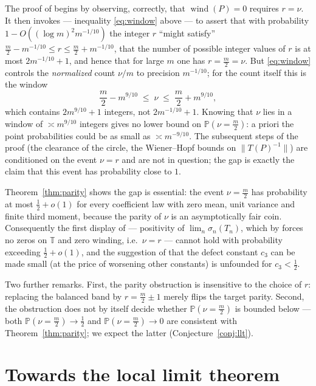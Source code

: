 \documentclass[11pt]{article}
\newcommand{\T}{\mathbb{T}}
\newcommand{\PP}{\mathbb{P}}
\newcommand{\wind}{\operatorname{wind}}
\begin{document}
The proof of \cite[Theorem~2.1]{Manrique} begins by observing, correctly, that
$\wind(P)=0$ requires $r=\nu$.  It then invokes
\cite[Theorem~3.1]{Manrique} --- inequality \eqref{eq:window} above --- to
assert that with probability $1-O((\log m)^2m^{-1/10})$ the integer $r$
``might satisfy''
$\frac m2-m^{-1/10}\le r\le\frac m2+m^{-1/10}$, that the number of possible
integer values of $r$ is at most $2m^{-1/10}+1$, and hence that for large $m$
one has $r=\frac m2=\nu$.  But \eqref{eq:window} controls the
\emph{normalized} count $\nu/m$ to precision $m^{-1/10}$; for the count itself
this is the window
\[
\frac m2-m^{9/10}\;\le\;\nu\;\le\;\frac m2+m^{9/10},
\]
which contains $2m^{9/10}+1$ integers, not $2m^{-1/10}+1$.  Knowing that $\nu$
lies in a window of $\asymp m^{9/10}$ integers gives no lower bound on
$\PP(\nu=\frac m2)$: a priori the point probabilities could be as small as
$\asymp m^{-9/10}$.  The subsequent steps of the proof (the clearance of the
circle, the Wiener--Hopf bounds on $\|T(P)^{-1}\|$) are conditioned on the event
$\nu=r$ and are not in question; the gap is exactly the claim that this event
has probability close to $1$.

Theorem~\ref{thm:parity} shows the gap is essential: the event $\nu=\frac m2$
has probability at most $\tfrac12+o(1)$ for every coefficient law with zero
mean, unit variance and finite third moment, because the parity of $\nu$ is an
asymptotically fair coin.  Consequently the first display of
\cite[Theorem~2.1]{Manrique} --- positivity of $\lim_n\sigma_n(T_n)$, which by
\cite[Corollary~6.5]{BG} forces no zeros on $\T$ and zero winding, i.e.\
$\nu=r$ --- cannot hold with probability exceeding $\tfrac12+o(1)$, and the
suggestion of \cite[Remark~2.2]{Manrique} that the defect constant $c_3$ can be
made small (at the price of worsening other constants) is unfounded for
$c_3<\tfrac12$.

Two further remarks.  First, the parity obstruction is insensitive to the choice
of $r$: replacing the balanced band by $r=\frac m2\pm1$ merely flips the target
parity.  Second, the obstruction does not by itself decide whether
$\PP(\nu=\frac m2)$ is bounded below --- both
$\PP(\nu=\frac m2)\to\frac12$ and $\PP(\nu=\frac m2)\to0$ are consistent with
Theorem~\ref{thm:parity}; we expect the latter (Conjecture~\ref{conj:llt}).

\section{Towards the local limit theorem}\label{sec:open}
\end{document}
